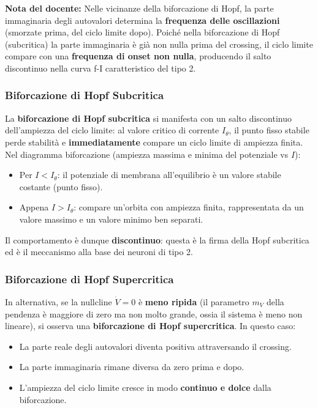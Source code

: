 \begin{tcolorbox}[colback=gray!5, colframe=gray!40, arc=2mm, boxrule=0.5pt]
\textbf{Nota del docente:} Nelle vicinanze della biforcazione di Hopf, la parte immaginaria degli autovalori determina la \textbf{frequenza delle oscillazioni} (smorzate prima, del ciclo limite dopo). Poiché nella biforcazione di Hopf (subcritica) la parte immaginaria è già non nulla prima del crossing, il ciclo limite compare con una \textbf{frequenza di onset non nulla}, producendo il salto discontinuo nella curva f-I caratteristico del tipo 2.
\end{tcolorbox}

\subsubsection{Biforcazione di Hopf Subcritica}

La \textbf{biforcazione di Hopf subcritica} si manifesta con un salto discontinuo dell'ampiezza del ciclo limite: al valore critico di corrente $I_\theta$, il punto fisso stabile perde stabilità e \textbf{immediatamente} compare un ciclo limite di ampiezza finita. Nel diagramma biforcazione (ampiezza massima e minima del potenziale vs $I$):
\begin{itemize}
    \item Per $I < I_\theta$: il potenziale di membrana all'equilibrio è un valore stabile costante (punto fisso).
    \item Appena $I > I_\theta$: compare un'orbita con ampiezza finita, rappresentata da un valore massimo e un valore minimo ben separati.
\end{itemize}

Il comportamento è dunque \textbf{discontinuo}: questa è la firma della Hopf subcritica ed è il meccanismo alla base dei neuroni di tipo 2.

\subsubsection{Biforcazione di Hopf Supercritica}

In alternativa, se la nullcline $\dot{V}=0$ è \textbf{meno ripida} (il parametro $m_V$ della pendenza è maggiore di zero ma non molto grande, ossia il sistema è meno non lineare), si osserva una \textbf{biforcazione di Hopf supercritica}. In questo caso:
\begin{itemize}
    \item La parte reale degli autovalori diventa positiva attraversando il crossing.
    \item La parte immaginaria rimane diversa da zero prima e dopo.
    \item L'ampiezza del ciclo limite cresce in modo \textbf{continuo e dolce} dalla biforcazione.
\end{itemize}

